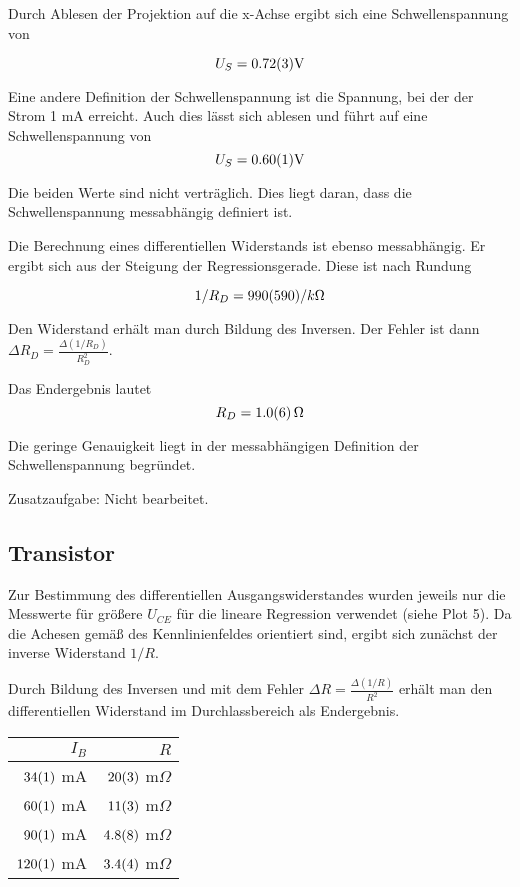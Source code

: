 Durch Ablesen der Projektion auf die x-Achse ergibt sich eine Schwellenspannung
von

\begin{equation}
  U_S = \num{0.72+-0.03} \text{V}
\end{equation}

Eine andere Definition der Schwellenspannung ist die Spannung, bei der der
Strom 1 mA erreicht. Auch dies lässt sich ablesen und führt auf eine
Schwellenspannung von
\begin{equation}
  U_S = \num{0.60\pm0.01} \text{V}
\end{equation}

Die beiden Werte sind nicht verträglich. Dies liegt daran, dass die
Schwellenspannung messabhängig definiert ist.

Die Berechnung eines differentiellen Widerstands ist ebenso messabhängig. Er
ergibt sich aus der Steigung der Regressionsgerade. Diese ist nach Rundung

\begin{equation}
  1/R_D = \num{990\pm590} / k \Omega
\end{equation}

Den Widerstand erhält man durch Bildung des Inversen. Der Fehler ist dann
$\Delta R_D = \frac{\Delta(1/R_D)}{R_D^2}$.

Das Endergebnis lautet
\begin{equation}
  R_D = \num{1.0+-0.6} \,\Omega
\end{equation}

Die geringe Genauigkeit liegt in der messabhängigen Definition der
Schwellenspannung begründet.

Zusatzaufgabe: Nicht bearbeitet.

\subsection{Transistor}

Zur Bestimmung des differentiellen Ausgangswiderstandes wurden jeweils nur die
Messwerte für größere $U_{CE}$ für die lineare Regression verwendet (siehe Plot
5). Da die Achesen gemäß des Kennlinienfeldes orientiert sind, ergibt sich
zunächst der inverse Widerstand $1/R$.

Durch Bildung des Inversen und mit dem Fehler $\Delta R =
\frac{\Delta(1/R)}{R^2}$ erhält man den differentiellen Widerstand im
Durchlassbereich als Endergebnis.


\vspace{0.5cm}
\begin{tabular}{ r r }
  $I_B$ & $R$ \\
  \hline
  $\num{34+-1}$ mA & $\num{20+-3}$ $\text{m}\Omega$ \\
  $\num{60+-1}$ mA & $\num{11+-3}$ $\text{m}\Omega$ \\
  $\num{90+-1}$ mA & $\num{4.8+-0.8}$ $\text{m}\Omega$ \\
  $\num{120+-1}$ mA & $\num{3.4+-0.4}$ $\text{m}\Omega$ \\
\end{tabular}
\vspace{0.5cm}


